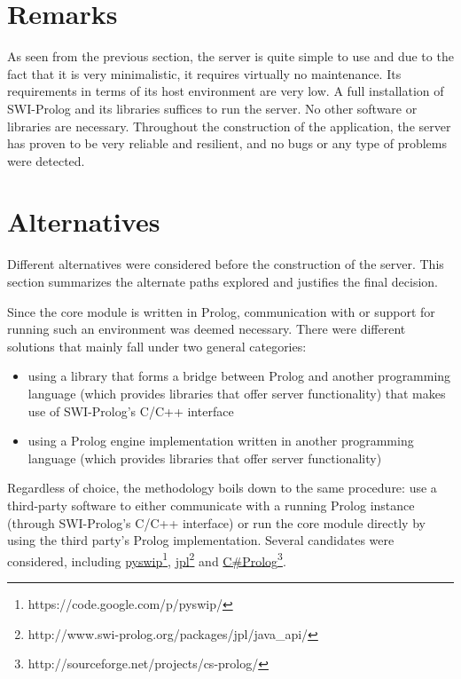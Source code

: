\documentclass[11pt,twoside,a4paper]{report}
\begin{document}
\section{Remarks}
\label{sec:remarklet}
As seen from the previous section, the server is quite simple to use and due to the fact that it is very minimalistic, it requires virtually no maintenance. Its requirements in terms of its host environment are very low. A full installation of SWI-Prolog and its libraries suffices to run the server. No other software or libraries are necessary. Throughout the construction of the application, the server has proven to be very reliable and resilient, and no bugs or any type of problems were detected.

\section{Alternatives}
Different alternatives were considered before the construction of the server. This section summarizes the alternate paths explored and justifies the final decision.

Since the core module is written in Prolog, communication with or support for running such an environment was deemed necessary. There were different solutions that mainly fall under two general categories:
\begin{itemize}
\item
using a library that forms a bridge between Prolog and another programming language (which provides libraries that offer server functionality) that makes use of SWI-Prolog's C/C++ interface
\item
using a Prolog engine implementation written in another programming language (which provides libraries that offer server functionality)
\end{itemize}

Regardless of choice, the methodology boils down to the same procedure: use a third-party software to either communicate with a running Prolog instance (through SWI-Prolog's C/C++ interface) or run the core module directly by using the third party's Prolog implementation. Several candidates were considered, including \href{https://code.google.com/p/pyswip/}{pyswip}\footnote{https://code.google.com/p/pyswip/}, \href{http://www.swi-prolog.org/packages/jpl/java\_api/}{jpl}\footnote{http://www.swi-prolog.org/packages/jpl/java\_api/} and \href{http://sourceforge.net/projects/cs-prolog/}{C\#Prolog}\footnote{http://sourceforge.net/projects/cs-prolog/}.
\end{document}
